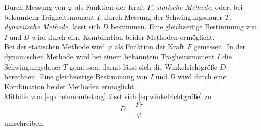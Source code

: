 Durch Messung von $\varphi$ als Funktion der Kraft $F$, \textit{statische Methode}, oder, bei bekanntem Trägheitsmoment $I$, durch Messung der Schwingungsdauer $T$, \textit{dynamische Methode}, lässt sich
$D$ bestimmen. Eine gleichzeitige Bestimmung von $I$ und $D$ wird durch eine Kombination beider Methoden ermöglicht. \\

Bei der statischen Methode wird $\varphi$ als Funktion der Kraft $F$ gemessen. In der dynamischen Methode wird bei einem bekanntem Trägheitsmoment $I$ die Schwingungsdauer $T$ gemessen, damit lässt sich die Winkelrichtgröße $D$ berechnen.
Eine gleichzeitige Bestimmung von $I$ und $D$ wird durch eine Kombination beider Methoden ermöglicht.\\

Mithilfe von \eqref{eq:drehmombetrag} lässt sich \eqref{eq:winkelrichtgröße} zu
\begin{equation}
  D = \frac{F r}{\varphi}
  \label{eq:WinkelrichtgröFr}
\end{equation}
umschreiben. 
